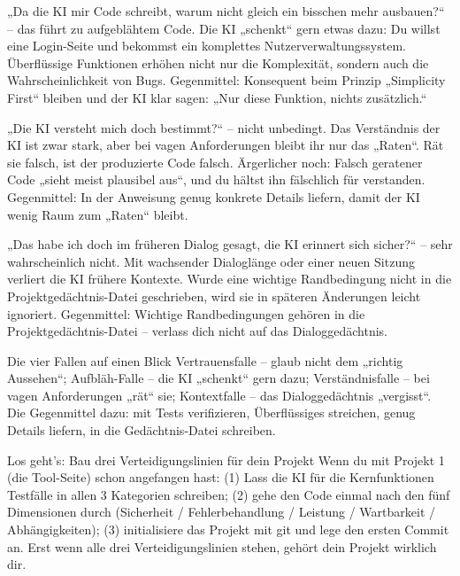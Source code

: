 
„Da die KI mir Code schreibt, warum nicht gleich ein bisschen mehr ausbauen?“ – das führt zu aufgeblähtem Code. Die KI „schenkt“ gern etwas dazu: Du willst eine Login-Seite und bekommst ein komplettes Nutzerverwaltungssystem. Überflüssige Funktionen erhöhen nicht nur die Komplexität, sondern auch die Wahrscheinlichkeit von Bugs. Gegenmittel: Konsequent beim Prinzip „Simplicity First“ bleiben und der KI klar sagen: „Nur diese Funktion, nichts zusätzlich.“


„Die KI versteht mich doch bestimmt?“ – nicht unbedingt. Das Verständnis der KI ist zwar stark, aber bei vagen Anforderungen bleibt ihr nur das „Raten“. Rät sie falsch, ist der produzierte Code falsch. Ärgerlicher noch: Falsch geratener Code „sieht meist plausibel aus“, und du hältst ihn fälschlich für verstanden. Gegenmittel: In der Anweisung genug konkrete Details liefern, damit der KI wenig Raum zum „Raten“ bleibt.


„Das habe ich doch im früheren Dialog gesagt, die KI erinnert sich sicher?“ – sehr wahrscheinlich nicht. Mit wachsender Dialoglänge oder einer neuen Sitzung verliert die KI frühere Kontexte. Wurde eine wichtige Randbedingung nicht in die Projektgedächtnis-Datei geschrieben, wird sie in späteren Änderungen leicht ignoriert. Gegenmittel: Wichtige Randbedingungen gehören in die Projektgedächtnis-Datei – verlass dich nicht auf das Dialoggedächtnis.

\begin{tcbwarn}{Die vier Fallen auf einen Blick}
Vertrauensfalle – glaub nicht dem „richtig Aussehen“; Aufbläh-Falle – die KI „schenkt“ gern dazu; Verständnisfalle – bei vagen Anforderungen „rät“ sie; Kontextfalle – das Dialoggedächtnis „vergisst“. Die Gegenmittel dazu: mit Tests verifizieren, Überflüssiges streichen, genug Details liefern, in die Gedächtnis-Datei schreiben.

\end{tcbwarn}

\begin{tcbpractice}{Los geht's: Bau drei Verteidigungslinien für dein Projekt}
Wenn du mit Projekt 1 (die Tool-Seite) schon angefangen hast: (1) Lass die KI für die Kernfunktionen Testfälle in allen 3 Kategorien schreiben; (2) gehe den Code einmal nach den fünf Dimensionen durch (Sicherheit / Fehlerbehandlung / Leistung / Wartbarkeit / Abhängigkeiten); (3) initialisiere das Projekt mit git und lege den ersten Commit an. Erst wenn alle drei Verteidigungslinien stehen, gehört dein Projekt wirklich dir.

\end{tcbpractice}


